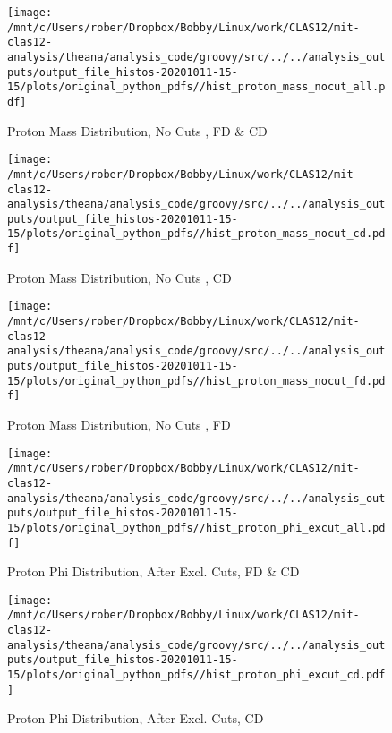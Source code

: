 \documentclass{article}
\begin{document}
\begin{landscape}
    \begin{figure}[h]
        \centering

        \texttt{[image: /mnt/c/Users/rober/Dropbox/Bobby/Linux/work/CLAS12/mit-clas12-analysis/theana/analysis\_code/groovy/src/../../analysis\_outputs/output\_file\_histos-20201011-15-15/plots/original\_python\_pdfs//hist\_proton\_mass\_nocut\_all.pdf]}
        \captionsetup{textformat=empty,labelformat=blank}
        \caption{Proton Mass Distribution, No Cuts , FD \& CD}
    \end{figure}
    \clearpage
    
    \begin{figure}[h]
        \centering

        \texttt{[image: /mnt/c/Users/rober/Dropbox/Bobby/Linux/work/CLAS12/mit-clas12-analysis/theana/analysis\_code/groovy/src/../../analysis\_outputs/output\_file\_histos-20201011-15-15/plots/original\_python\_pdfs//hist\_proton\_mass\_nocut\_cd.pdf]}
        \captionsetup{textformat=empty,labelformat=blank}
        \caption{Proton Mass Distribution, No Cuts , CD}
    \end{figure}
    \clearpage
    
    \begin{figure}[h]
        \centering

        \texttt{[image: /mnt/c/Users/rober/Dropbox/Bobby/Linux/work/CLAS12/mit-clas12-analysis/theana/analysis\_code/groovy/src/../../analysis\_outputs/output\_file\_histos-20201011-15-15/plots/original\_python\_pdfs//hist\_proton\_mass\_nocut\_fd.pdf]}
        \captionsetup{textformat=empty,labelformat=blank}
        \caption{Proton Mass Distribution, No Cuts , FD}
    \end{figure}
    \clearpage
    
    \begin{figure}[h]
        \centering

        \texttt{[image: /mnt/c/Users/rober/Dropbox/Bobby/Linux/work/CLAS12/mit-clas12-analysis/theana/analysis\_code/groovy/src/../../analysis\_outputs/output\_file\_histos-20201011-15-15/plots/original\_python\_pdfs//hist\_proton\_phi\_excut\_all.pdf]}
        \captionsetup{textformat=empty,labelformat=blank}
        \caption{Proton Phi Distribution, After Excl. Cuts, FD \& CD}
    \end{figure}
    \clearpage
    
    \begin{figure}[h]
        \centering

        \texttt{[image: /mnt/c/Users/rober/Dropbox/Bobby/Linux/work/CLAS12/mit-clas12-analysis/theana/analysis\_code/groovy/src/../../analysis\_outputs/output\_file\_histos-20201011-15-15/plots/original\_python\_pdfs//hist\_proton\_phi\_excut\_cd.pdf]}
        \captionsetup{textformat=empty,labelformat=blank}
        \caption{Proton Phi Distribution, After Excl. Cuts, CD}
    \end{figure}
    \clearpage
    

\end{landscape}
\end{document}
